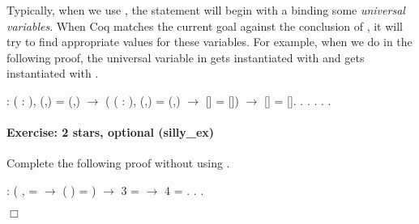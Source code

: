 \documentclass[12pt]{report}
\begin{document}
 Typically, when we use  , the statement  will
    begin with a \coqdockw{\ensuremath{\forall}} binding some \textit{universal variables}.  When
    Coq matches the current goal against the conclusion of , it
    will try to find appropriate values for these variables.  For
    example, when we do   in the following proof, the
    universal variable  in  gets instantiated with  and 
    gets instantiated with . \begin{coqdoccode}
\coqdocemptyline
\coqdocnoindent
{}  : \coqdockw{\ensuremath{\forall}} (  : ),\coqdoceol
\coqdocindent{2.50em}
(,) = (,)  \ensuremath{\rightarrow}\coqdoceol
\coqdocindent{2.50em}
(\coqdockw{\ensuremath{\forall}} (  : ), (,) = (,) \ensuremath{\rightarrow} [] = []) \ensuremath{\rightarrow}\coqdoceol
\coqdocindent{2.50em}
[] = [].\coqdoceol
\coqdocnoindent
{}.\coqdoceol
\coqdocindent{1.00em}
    .\coqdoceol
\coqdocindent{1.00em}
 .  . .\coqdoceol
\coqdocemptyline
\end{coqdoccode}
\paragraph{Exercise: 2 stars, optional (silly\_ex)}

 Complete the following proof without using . \begin{coqdoccode}
\coqdocemptyline
\coqdocnoindent
{}  : \coqdoceol
\coqdocindent{2.50em}
(\coqdockw{\ensuremath{\forall}} ,   =  \ensuremath{\rightarrow}  ( ) = ) \ensuremath{\rightarrow}\coqdoceol
\coqdocindent{2.50em}
 3 =  \ensuremath{\rightarrow}\coqdoceol
\coqdocindent{2.50em}
 4 = .\coqdoceol
\coqdocnoindent
{}.\coqdoceol
 .\coqdoceol
\end{coqdoccode}
\ensuremath{\Box} 
\end{document}
